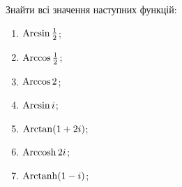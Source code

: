 \setcounter{problem}{80}
\begin{problem}
	Знайти всі значення наступних функцій:
	\begin{multicols}{3}
	\begin{enumerate}
		\item $\operatorname{Arcsin} \frac 12$;
		\item $\operatorname{Arccos} \frac 12$;
		\item $\operatorname{Arccos} 2$;
		\item $\operatorname{Arcsin} i$;
		\item $\operatorname{Arctan} (1 + 2i)$;
		\item $\operatorname{Arccosh} 2i$;
		\item $\operatorname{Arctanh} (1 - i)$;
	\end{enumerate}
	\end{multicols}
\end{problem}
